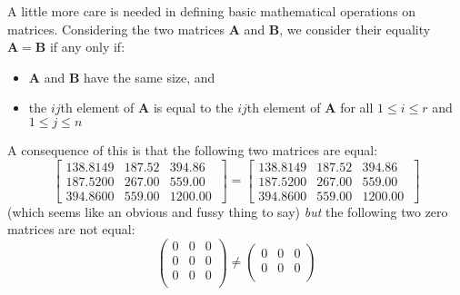 
A little more care is needed in defining basic mathematical operations on matrices.   Considering the two matrices $\boldsymbol{A}$ and $\boldsymbol{B}$, we consider their equality $\boldsymbol{A} = \boldsymbol{B}$ if any only if:
\begin{itemize}
\item $\boldsymbol{A}$ and $\boldsymbol{B}$ have the same size, and
\item the $ij$th element of $\boldsymbol{A}$ is equal to the $ij$th element of $\boldsymbol{A}$ for all $1 \leq i \leq r$ and $1 \leq j \leq n$
\end{itemize}

A consequence of this is that the following two matrices are equal:
\begin{displaymath}
\left[ \begin{array}{rrr}
138.8149 & 187.52 & 394.86\\
187.5200 & 267.00 &  559.00\\
394.8600 & 559.00 & 1200.00\
\end{array}
\right]
= 
\left[ \begin{array}{rrr}
138.8149 & 187.52 & 394.86\\
187.5200 & 267.00 &  559.00\\
394.8600 & 559.00 & 1200.00\
\end{array}
\right]
\end{displaymath}
(which seems like an obvious and fussy thing to say) \emph{but} the following two zero matrices are not equal:
\begin{displaymath} 
\left( \begin{array}{rrr}
0 & 0 & 0 \\
0 & 0 &  0 \\
0 & 0 & 0 \\
\end{array}
\right)
\neq
\left( \begin{array}{rrr}
0 & 0 & 0 \\
0 & 0 &  0 \\
\end{array}
\right)
\end{displaymath}

